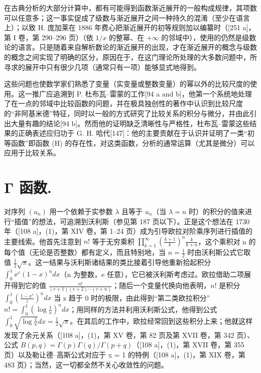 在古典分析的大部分计算中，都有可能得到函数渐近展开的一般构成规律，其项数可以任意多；这一事实促成了级数与渐近展开之间一种持久的混淆（至少在语言上）；以致 H. 庞加莱在 1886 年费心把渐近展开的初等规则加以编纂时（{[}251 a{]}，第 I 卷，第 290–296 页）（依 \(1/x\) 的整幂、在 \(+\infty\) 的邻域中），使用的仍然是级数论的语言。只是随着来自解析数论的渐近展开的出现，才在渐近展开的概念与级数的概念之间实现了明确的区分，原因在于，在这门理论所处理的大多数问题中，所寻求的展开中只有很少几项（通常只有一项）能够显式地得到。

这些问题也使数学家们熟悉了变量（实变量或整数变量）的幂以外的比较尺度的使用。这一推广应追溯到 P. 杜布瓦–雷蒙的工作{[}94 a and b{]}，他第一个系统地处理了在一点的邻域中比较函数的问题，并在极具独创性的著作中认识到比较尺度的“非阿基米德”特征，同时以一般的方式研究了比较关系的积分与微分，并由此引出大量有趣的结论{[}94 b{]}。然而他的证明缺乏清晰性与严格性，杜布瓦–雷蒙这些结果的正确表述应归功于 G. H. 哈代{[}147{]}：他的主要贡献在于认识并证明了一类“初等函数”即函数 (H) 的存在性，对这类函数，分析的通常运算（尤其是微分）可以应用于比较关系。

\chapter{Γ 函数.}

对序列 \((u_{n})\) 用一个依赖于实参数 \(\lambda\) 且等于 \(u_{n}\)（当 \(\lambda = n\) 时）的积分的值来进行“插值”的想法，可追溯到沃利斯（参见第 187 页以下）。正是这个想法在 1730 年（{[}108 a{]}，(1)，第 XIV 卷，第 1–24 页）成为引导欧拉对阶乘序列进行插值的主要线索。他首先注意到 \(n!\) 等于无穷乘积 \(\prod_{k=1}^{\infty}\left(\frac{k+1}{k}\right)^{n}\frac{k}{k+n}\)，这个乘积对 n 的每个值（无论是否整数）都有定义，而且特别地，当 \(n = \frac{1}{2}\) 时由沃利斯公式它取值 \(\frac{1}{2}\sqrt{\pi}\)。这一结果与沃利斯诸结果的类比接着引导他重新拾起积分 \(\int_{0}^{1} x^{e}(1-x)^{n} dx\)（n 为整数，e 任意），它已被沃利斯考虑过。欧拉借助二项展开得到它的值 \(\frac{n!}{(e+1)(e+2)\cdots(e+n)}\)；随后一个变量代换向他表明，\(n!\) 是积分 \(\int_{0}^{1}\left(\frac{1-x^{s}}{z}\right)^{n} dx\) 当 z 趋于 0 时的极限，由此得到“第二类欧拉积分”\(n! = \int_{0}^{1}\left(\log\frac{1}{x}\right)^{n} dx\)；用同样的方法并利用沃利斯公式，他得到公式 \(\int_{0}^{1}\sqrt{\log\frac{1}{x}} dx = \frac{1}{2}\sqrt{\pi}\)。在其后的工作中，欧拉经常回到这些积分上来；他就这样发现了余元关系（{[}108 a{]}，(1)，第 XV 卷，第 82 页及第 XVII 卷，第 342 页）、公式 \(B(p,q) = \Gamma(p)\Gamma(q)/\Gamma(p+q)\)（{[}108 a{]}，(1)，第 XVII 卷，第 355 页）以及勒让德–高斯公式对应于 x = 1 的特例（{[}108 a{]}，(1)，第 XIX 卷，第 483 页）；当然，这一切都全然不关心收敛性的问题。

